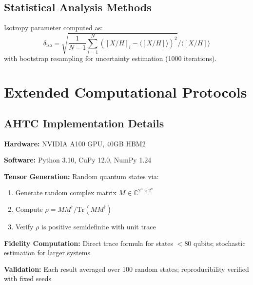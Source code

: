 \documentclass[twocolumn,aps,prd,superscriptaddress,nofootinbib]{revtex4-2}
\begin{document}
\subsection{Statistical Analysis Methods}

Isotropy parameter computed as:
\begin{equation}
\delta_{\text{iso}} = \sqrt{\frac{1}{N-1} \sum_{i=1}^{N} \left( [X/H]_i - \langle [X/H] \rangle \right)^2} \bigg/ \langle [X/H] \rangle
\end{equation}
with bootstrap resampling for uncertainty estimation (1000 iterations).

\section{Extended Computational Protocols}

\subsection{AHTC Implementation Details}

\textbf{Hardware:} NVIDIA A100 GPU, 40GB HBM2

\textbf{Software:} Python 3.10, CuPy 12.0, NumPy 1.24

\textbf{Tensor Generation:} Random quantum states via:
\begin{enumerate}
    \item Generate random complex matrix $M \in \mathbb{C}^{2^n \times 2^n}$
    \item Compute $\rho = M M^\dagger / \text{Tr}(M M^\dagger)$
    \item Verify $\rho$ is positive semidefinite with unit trace
\end{enumerate}

\textbf{Fidelity Computation:} Direct trace formula for states $< 80$ qubits; stochastic estimation for larger systems

\textbf{Validation:} Each result averaged over 100 random states; reproducibility verified with fixed seeds
\end{document}
